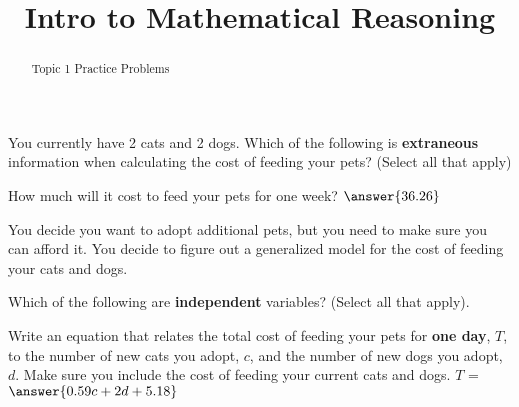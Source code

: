 \documentclass{ximera}
\title{Intro to Mathematical Reasoning}
\begin{document}
\begin{abstract}
Topic 1 Practice Problems
\end{abstract}
\maketitle

%





\begin{problem}
    You currently have 2 cats and 2 dogs.  Which of the following is \textbf{extraneous} information when calculating the cost of feeding your pets? (Select all that apply)
    \begin{selectAll}
    \end{selectAll}
    \begin{problem}
        How much will it cost to feed your pets for one week?
        $\answer{36.26}$
        \begin{problem}
            You decide you want to adopt additional pets, but you need to make sure you can afford it.  You decide to figure out a generalized model for the cost of feeding your cats and dogs.

            Which of the following are \textbf{independent} variables? (Select all that apply).
            \begin{selectAll}
            \end{selectAll}

            \begin{problem}
                Write an equation that relates the total cost of feeding your pets for \textbf{one day}, $T$, to the number of new cats you adopt, $c$, and the number of new dogs you adopt, $d$.  Make sure you include the cost of feeding your current cats and dogs.
                $T$ = $\answer{0.59c + 2d + 5.18}$
            \end{problem}
        \end{problem}
    \end{problem}
\end{problem}
\end{document}
